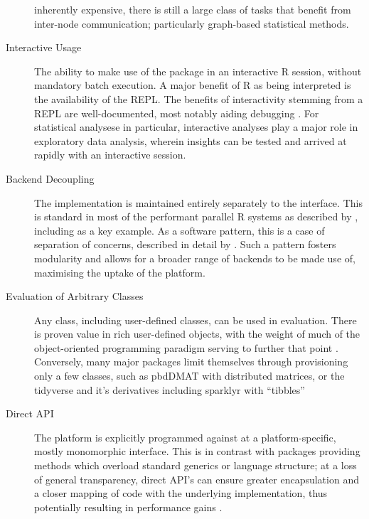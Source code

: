 \documentclass[a4paper,10pt]{article}
\begin{document}
\begin{description}
	      inherently expensive, there is still a large class of tasks
	      that benefit from inter-node communication\cite{walker1996mpi};
	      particularly graph-based statistical methods.
	\item[Interactive Usage]
	      The ability to make use of the package in an interactive R
	      session, without mandatory batch execution.
	      A major benefit of R as being interpreted is the availability
	      of the REPL. The benefits of interactivity stemming from a REPL
	      are well-documented, most notably aiding debugging
	      \cite{mccarthy1978history}. For statistical analysese in 
	      particular, interactive analyses play a major role in 
	      exploratory data analysis, wherein insights can be tested
	      and arrived at rapidly with an interactive session.
	\item[Backend Decoupling]
	      The implementation is maintained entirely separately to the
	      interface.
	      This is standard in most of the performant parallel R systems
	      as described by \cite{eddelbuettel2019parallel}, including
	      \cite{microsoft20} as a key example.
	      As a software pattern, this is a case of separation of
	      concerns, described in detail by \cite{dijkstra1982role}.
	      Such a pattern fosters modularity and allows for a broader
	      range of backends to be made use of, maximising the uptake of
	      the platform.
	\item[Evaluation of Arbitrary Classes]
	      Any class, including user-defined classes, can be used in
	      evaluation.
	      There is proven value in rich user-defined objects, with the
	      weight of much of the object-oriented programming paradigm
	      serving to further that point \cite{dahl2004simula}.
	      Conversely, many major packages limit themselves through
	      provisioning only a few classes, such as pbdDMAT with
	      distributed matrices, or the tidyverse and it's derivatives
	      including sparklyr with ``tibbles'' \cite{pbdDMATpackage}
	      \cite{wickham2019welcome}
	\item[Direct API]
	      The platform is explicitly programmed against at a
	      platform-specific, mostly monomorphic interface. 
	      This is in contrast with packages providing methods which
	      overload standard generics or language structure;
	      at a loss of general transparency, direct API's can ensure
	      greater encapsulation and a closer mapping of code with the
	      underlying implementation, thus potentially resulting in
	      performance gains \cite{bierhoff2009api}.

\end{description}
\end{document}
